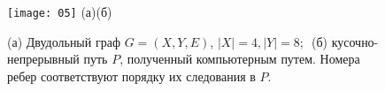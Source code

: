 \begin{figure}[H]
{\texttt{[image: 05]}}
{\small %
\hspace{-10cm}(а)\hspace{5cm}(б)}
\caption{(а) Двудольный граф $G=(X,Y,E)$, $|X|=4,|Y|=8;$\
 (б) кусочно-непрерывный путь $P$, полученный компьютерным путем. Номера ребер соответствуют порядку их следования в $P$.}
\label{akmfig5}
\end{figure}
\par\medskip
